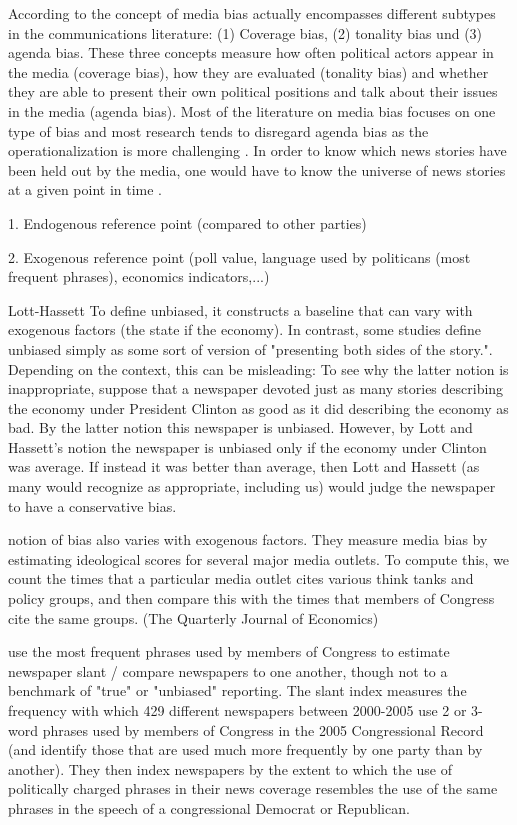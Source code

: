\documentclass[12pt,a4paper,notitlepage]{article}
\begin{document}
According to \citet{dalessio_media_2000} the concept of media bias actually encompasses different subtypes in the communications literature: (1) Coverage bias, (2) tonality bias und (3) agenda bias. These three concepts measure how often political actors appear in the media (coverage bias), how they are evaluated (tonality bias) and whether they are able to present their own political positions and talk about their issues in the media (agenda bias). Most of the literature on media bias focuses on one type of bias and most research tends to disregard agenda bias as the operationalization is more challenging \citet{eberl_one_2017}. In order to know which news stories have been held out by the media, one would have to know the universe of news stories at a given point in time \citep{dalessio_media_2000}. 



1. Endogenous reference point (compared to other parties)

2. Exogenous reference point (poll value, language used by politicans (most frequent phrases), economics indicators,...)

\citet{lott_is_2014}

Lott-Hassett To define unbiased, it constructs a baseline that can vary with exogenous factors (the state if the economy). In contrast, some studies define unbiased simply as some sort of version of "presenting both sides of the story.". Depending on the context, this can be misleading: To see why the latter notion is inappropriate, suppose that a newspaper devoted just as many stories describing the economy under President Clinton as good as it did describing the economy as bad. By the latter notion this newspaper is unbiased. However, by Lott and Hassett's notion the newspaper is unbiased only if the economy under Clinton was average. If instead it was better than average, then Lott and Hassett (as many would recognize as appropriate, including us) would judge the newspaper to have a conservative bias. 

\citet{groseclose_measure_2005} notion of bias also varies with exogenous factors. They measure media bias by estimating ideological scores for several major media outlets. To compute this, we count the times that a particular media outlet cites various think tanks and policy groups, and then compare this with the times that members of Congress cite the same groups. (The Quarterly Journal of Economics)

\citet{gentzkow_what_2010} use the most frequent phrases used by members of Congress to estimate newspaper slant / compare newspapers to one another, though not to a benchmark of "true" or "unbiased" reporting.  The slant index measures the frequency with which 429 different newspapers between 2000-2005 use 2 or 3-word phrases used by members of Congress in the 2005 Congressional Record (and identify those that are used much more frequently by one party than by another). They then index newspapers by the extent to which the use of politically charged phrases in their news coverage resembles the use of the same phrases in the speech of a congressional Democrat or Republican.
\end{document}
